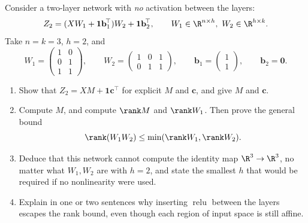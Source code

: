 \begin{exercise}\label{ex:ml-5}
Consider a two-layer network with \emph{no} activation between the layers:
\[
  Z_2=(XW_1+\mathbf{1}\mathbf{b}_1^{\!\top})W_2+\mathbf{1}\mathbf{b}_2^{\!\top},
  \qquad W_1\in\R^{n\times h},\ W_2\in\R^{h\times k}.
\]
Take $n=k=3$, $h=2$, and
\[
  W_1=\begin{pmatrix}1&0\\0&1\\1&1\end{pmatrix},\qquad
  W_2=\begin{pmatrix}1&0&1\\0&1&1\end{pmatrix},\qquad
  \mathbf{b}_1=\begin{pmatrix}1\\1\end{pmatrix},\qquad
  \mathbf{b}_2=\mathbf{0}.
\]
\begin{enumerate}[label=(\alph*)]
  \item Show that $Z_2=XM+\mathbf{1}\mathbf{c}^{\!\top}$ for explicit $M$ and
    $\mathbf{c}$, and give $M$ and $\mathbf{c}$.
  \item Compute $M$, and compute $\rank M$ and $\rank W_1$. Then prove the
    general bound
    \[
      \rank(W_1W_2)\le\min(\rank W_1,\rank W_2).
    \]
  \item Deduce that this network cannot compute the identity map $\R^3\to\R^3$,
    no matter what $W_1,W_2$ are with $h=2$, and state the smallest $h$ that
    would be required if no nonlinearity were used.
  \item Explain in one or two sentences why inserting $\operatorname{relu}$
    between the layers escapes the rank bound, even though each region of input
    space is still affine.
\end{enumerate}
\end{exercise}

